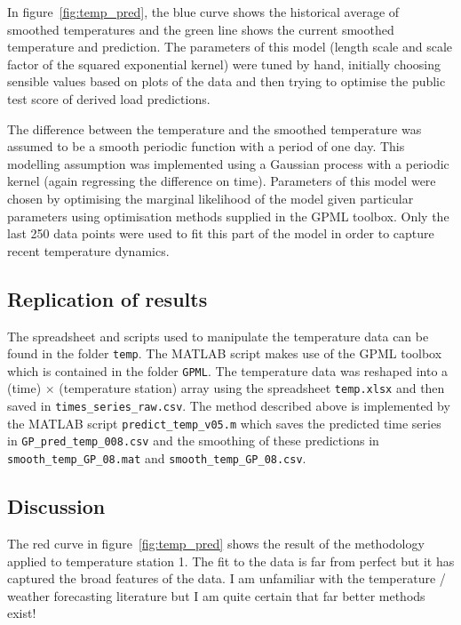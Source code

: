 \documentclass[preprint,authoryear,12pt]{elsarticle}
\begin{document}
In figure~\ref{fig:temp_pred}, the blue curve shows the historical average of smoothed temperatures and the green line shows the current smoothed temperature and prediction.
The parameters of this model (length scale and scale factor of the squared exponential kernel) were tuned by hand, initially choosing sensible values based on plots of the data and then trying to optimise the public test score of derived load predictions.

The difference between the temperature and the smoothed temperature was assumed to be a smooth periodic function with a period of one day.
This modelling assumption was implemented using a Gaussian process with a periodic kernel (again regressing the difference on time).
Parameters of this model were chosen by optimising the marginal likelihood of the model given particular parameters using optimisation methods supplied in the GPML toolbox\footnotemark.
Only the last 250 data points were used to fit this part of the model in order to capture recent temperature dynamics.

\subsection{Replication of results}

The spreadsheet and scripts used to manipulate the temperature data can be found in the folder \texttt{temp}.
The MATLAB script makes use of the GPML toolbox which is contained in the folder \texttt{GPML}.
The temperature data was reshaped into a (time) $\times$ (temperature station) array using the spreadsheet \texttt{temp.xlsx} and then saved in \texttt{times\_series\_raw.csv}.
The method described above is implemented by the MATLAB script \texttt{predict\_temp\_v05.m} which saves the predicted time series in \texttt{GP\_pred\_temp\_008.csv} and the smoothing of these predictions in \texttt{smooth\_temp\_GP\_08.mat} and \texttt{smooth\_temp\_GP\_08.csv}.

\subsection{Discussion}

The red curve in figure~\ref{fig:temp_pred} shows the result of the methodology applied to temperature station 1.
The fit to the data is far from perfect but it has captured the broad features of the data.
I am unfamiliar with the temperature / weather forecasting literature but I am quite certain that far better methods exist!
\end{document}
